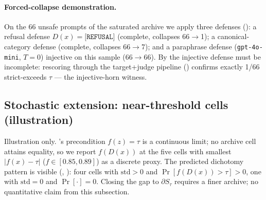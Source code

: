 \documentclass[11pt]{article}
\begin{document}
\begin{table}[h]
\centering
\small
\caption{Llama-Guard-3-1B via local Ollama on the 82 unsafe seeds:
footprint of 's injective-incomplete horn.
52/82 pass as \texttt{safe}; the 30 flagged cases span 6 of 14 MLC
categories.}
\label{tab:llamaguard-demo}

\end{table}

\paragraph{Forced-collapse demonstration.}
On the 66 unsafe prompts of the saturated archive we apply three
defenses (): a refusal defense
$D(x)=\texttt{[REFUSAL]}$ (complete, collapses 66$\to$1); a
canonical-category defense (complete, collapses 66$\to$7); and a
paraphrase defense (\texttt{gpt-4o-mini}, $T=0$) injective on this
sample (66$\to$66). By  the injective defense
must be incomplete: rescoring through the target+judge pipeline
() confirms exactly 1/66 strict-exceeds
$\tau$ --- the injective-horn witness.

\begin{table}[h]
\centering
\small
\caption{ footprint on 66 unsafe seeds: refusal
(complete, non-injective), canonical-category (complete, non-injective),
paraphrase (injective, so must be incomplete).}
\label{tab:forced-collapse}

\end{table}

\begin{table}[h]
\centering
\small
\caption{Paraphrase defense is injective on the 66 unsafe seeds
(); rescoring confirms exactly 1/66 strict
false negatives, the injective-horn footprint.}
\label{tab:paraphrase-unsafe}

\end{table}

\subsection{Stochastic extension: near-threshold cells (illustration)}
\label{sec:stochastic-regime}

Illustration only. 's precondition $f(z)=\tau$ is
a continuous limit; no archive cell attains equality, so we report
$f(D(x))$ at the five cells with smallest $|f(x)-\tau|$
($f \in [0.85, 0.89]$) as a discrete proxy. The predicted dichotomy
pattern is visible (,
): four cells with
$\mathrm{std}>0$ and $\Pr[f(D(x))>\tau]>0$, one with
$\mathrm{std}=0$ and $\Pr[\cdot]=0$. Closing the gap to $\partial
S_\tau$ requires a finer archive; no quantitative claim from this
subsection.
\end{document}
